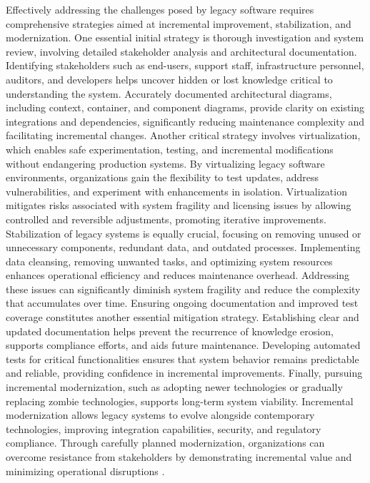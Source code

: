 Effectively addressing the challenges posed by legacy software requires comprehensive strategies aimed at incremental improvement, stabilization, and modernization.
One essential initial strategy is thorough investigation and system review, involving detailed stakeholder analysis and architectural documentation.
Identifying stakeholders such as end-users, support staff, infrastructure personnel, auditors, and developers helps uncover hidden or lost knowledge critical to understanding the system.
Accurately documented architectural diagrams, including context, container, and component diagrams, provide clarity on existing integrations and dependencies, significantly reducing maintenance complexity and facilitating incremental changes.
Another critical strategy involves virtualization, which enables safe experimentation, testing, and incremental modifications without endangering production systems.
By virtualizing legacy software environments, organizations gain the flexibility to test updates, address vulnerabilities, and experiment with enhancements in isolation.
Virtualization mitigates risks associated with system fragility and licensing issues by allowing controlled and reversible adjustments, promoting iterative improvements.
Stabilization of legacy systems is equally crucial, focusing on removing unused or unnecessary components, redundant data, and outdated processes.
Implementing data cleansing, removing unwanted tasks, and optimizing system resources enhances operational efficiency and reduces maintenance overhead.
Addressing these issues can significantly diminish system fragility and reduce the complexity that accumulates over time.
Ensuring ongoing documentation and improved test coverage constitutes another essential mitigation strategy.
Establishing clear and updated documentation helps prevent the recurrence of knowledge erosion, supports compliance efforts, and aids future maintenance.
Developing automated tests for critical functionalities ensures that system behavior remains predictable and reliable, providing confidence in incremental improvements.
Finally, pursuing incremental modernization, such as adopting newer technologies or gradually replacing zombie technologies, supports long-term system viability.
Incremental modernization allows legacy systems to evolve alongside contemporary technologies, improving integration capabilities, security, and regulatory compliance.
Through carefully planned modernization, organizations can overcome resistance from stakeholders by demonstrating incremental value and minimizing operational disruptions \citep{annettWorkingLegacySystems2019}.

